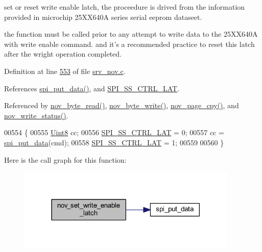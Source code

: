 set or reset write enable latch, the proceedure is drived from the information provided in microchip 25\+X\+X640\+A series serial eeprom dataseet. 

the function must be called prior to any attempt to write data to the 25\+X\+X640\+A with write enable command. and it's a recommended practice to reset this latch after the wright operation completed. 

Definition at line \hyperlink{a00060_source_l00553}{553} of file \hyperlink{a00060_source}{srv\+\_\+nov.\+c}.



References \hyperlink{a00032_source_l00097}{spi\+\_\+put\+\_\+data()}, and \hyperlink{a00013_source_l00110}{S\+P\+I\+\_\+\+S\+S\+\_\+\+C\+T\+R\+L\+\_\+\+L\+A\+T}.



Referenced by \hyperlink{a00060_source_l00633}{nov\+\_\+byte\+\_\+read()}, \hyperlink{a00060_source_l00608}{nov\+\_\+byte\+\_\+write()}, \hyperlink{a00060_source_l00663}{nov\+\_\+page\+\_\+cpy()}, and \hyperlink{a00060_source_l00586}{nov\+\_\+write\+\_\+status()}.


\begin{DoxyCode}
00554 \{
00555     \hyperlink{a00072_af84840501dec18061d18a68c162a8fa2}{Uint8} cc;
00556     \hyperlink{a00013_aa8b53e04161d178ebd9c01edf1584039}{SPI\_SS\_CTRL\_LAT} = 0;
00557     cc = \hyperlink{a00013_a19e2dff580e4d1b2198fa9108fca81ac}{spi\_put\_data}(cmd);
00558     \hyperlink{a00013_aa8b53e04161d178ebd9c01edf1584039}{SPI\_SS\_CTRL\_LAT} = 1;
00559 
00560 \}
\end{DoxyCode}


Here is the call graph for this function\+:
\nopagebreak
\begin{figure}[H]
\begin{center}
\leavevmode
\includegraphics[width=297pt]{d5/d16/a00029_a7b698f4b0088c4e28951c2204b7b821e_cgraph}
\end{center}
\end{figure}




